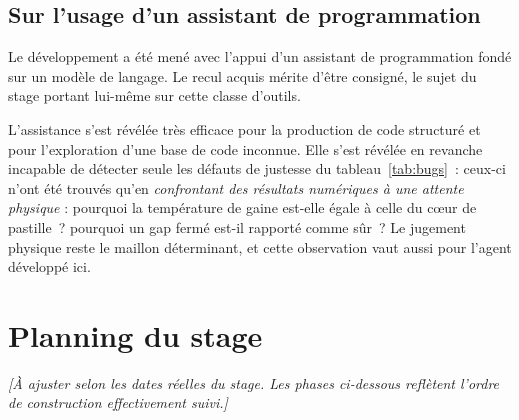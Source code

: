 \documentclass[12pt,a4paper,french]{report}
\begin{document}
\subsection{Sur l'usage d'un assistant de programmation}

Le développement a été mené avec l'appui d'un assistant de programmation fondé
sur un modèle de langage. Le recul acquis mérite d'être consigné, le sujet du
stage portant lui-même sur cette classe d'outils.

L'assistance s'est révélée très efficace pour la production de code structuré
et pour l'exploration d'une base de code inconnue. Elle s'est révélée en
revanche incapable de détecter seule les défauts de justesse du
tableau~\ref{tab:bugs}~: ceux-ci n'ont été trouvés qu'en \emph{confrontant des
résultats numériques à une attente physique} : pourquoi la température de gaine
est-elle égale à celle du c\oe ur de pastille~? pourquoi un gap fermé est-il
rapporté comme sûr~? Le jugement physique reste le maillon déterminant, et cette
observation vaut aussi pour l'agent développé ici.

\clearpage

\section*{Planning du stage}

\vspace{0.4cm}

\noindent
\textit{\color{red}[À ajuster selon les dates réelles du stage. Les phases
ci-dessous reflètent l'ordre de construction effectivement suivi.]}

\vspace{0.6cm}
\end{document}
